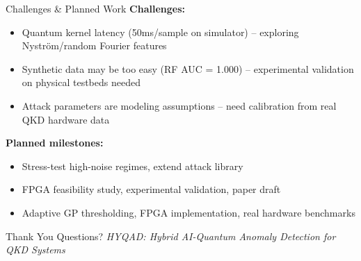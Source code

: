 \documentclass[10pt,aspectratio=169]{beamer}
\begin{document}
\begin{frame}{Challenges \& Planned Work}
  \textbf{Challenges:}
  \begin{itemize}
    \item Quantum kernel latency (50ms/sample on simulator) -- exploring Nystr\"om/random Fourier features
    \item Synthetic data may be too easy (RF AUC = 1.000) -- experimental validation on physical testbeds needed
    \item Attack parameters are modeling assumptions -- need calibration from real QKD hardware data
  \end{itemize}
  \vfill
  \textbf{Planned milestones:}
  \begin{itemize}
    \item[\textbf{Week 3}] Stress-test high-noise regimes, extend attack library
    \item[\textbf{Week 4}] FPGA feasibility study, experimental validation, paper draft
    \item[\textbf{Month 2}] Adaptive GP thresholding, FPGA implementation, real hardware benchmarks
  \end{itemize}
\end{frame}

\begin{frame}{Thank You}
  \centering
  \vfill
  {\huge Questions?}
  \vfill
  \textit{HYQAD: Hybrid AI-Quantum Anomaly Detection for QKD Systems}
\end{frame}
\end{document}

